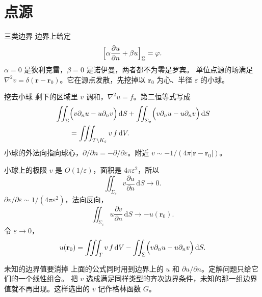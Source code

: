 \documentclass[fontset=windows, chinese, 10pt, xcolor=dvipsnames]{beamer}
\begin{document}
\section{点源}

\begin{frame}{三类边界}
  边界上给定
  \[
    \Bigl[\alpha\frac{\partial u}{\partial n}+\beta u\Bigr]_{\Sigma}=\varphi.
  \]
  $\alpha=0$ 是狄利克雷，$\beta=0$ 是诺伊曼，两者都不为零是罗宾。
  \vspace{0.4em}
  单位点源的场满足 $\nabla^2 v=\delta(\mathbf{r}-\mathbf{r}_0)$。它在源点发散，先挖掉以 $\mathbf{r}_0$ 为心、半径 $\varepsilon$ 的小球。
\end{frame}

\begin{frame}{挖去小球}
  剩下的区域里 $v$ 调和，$\nabla^2 u=f$。第二恒等式写成
  \begin{align*}
    &\iint_{\Sigma}\Bigl(v\partial_n u-u\partial_n v\Bigr)\,\mathrm{d}S
    +\iint_{\Sigma_{\varepsilon}}\Bigl(v\partial_n u-u\partial_n v\Bigr)\,\mathrm{d}S\\
    &\qquad=\iiint_{T\setminus K_{\varepsilon}} v\,f\,\mathrm{d}V.
  \end{align*}
  小球的外法向指向球心，$\partial/\partial n=-\partial/\partial\varepsilon$。附近 $v\sim -1/(4\pi|\mathbf{r}-\mathbf{r}_0|)$。
\end{frame}

\begin{frame}{小球上的极限}
  $v$ 是 $O(1/\varepsilon)$，面积是 $4\pi\varepsilon^2$，所以
  \[
    \iint_{\Sigma_{\varepsilon}} v\frac{\partial u}{\partial n}\,\mathrm{d}S\to 0.
  \]
  $\partial v/\partial\varepsilon\sim 1/(4\pi\varepsilon^2)$，法向反向，
  \[
    \iint_{\Sigma_{\varepsilon}} u\frac{\partial v}{\partial n}\,\mathrm{d}S\to -u(\mathbf{r}_0).
  \]
  令 $\varepsilon\to 0$，
  \begin{equation*}
    u(\mathbf{r}_0)
    =\iiint_T v\,f\,\mathrm{d}V
    -\iint_{\Sigma}\Bigl(
      v\partial_n u-u\partial_n v
    \Bigr)\,\mathrm{d}S.
  \end{equation*}
\end{frame}

\begin{frame}{未知的边界值要消掉}
  上面的公式同时用到边界上的 $u$ 和 $\partial u/\partial n$。定解问题只给它们的一个线性组合。
  \vspace{0.4em}
  把 $v$ 选成满足同样类型的齐次边界条件，未知的那一组边界值就不再出现。这样选出的 $v$ 记作格林函数 $G$。
\end{frame}
\end{document}
